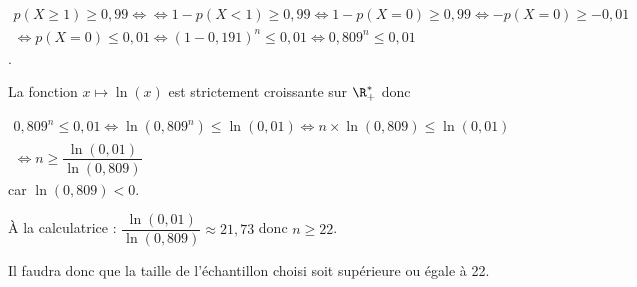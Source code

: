 \begin{enumerate}
	$\begin{gathered}p(X\geqslant 1)\geqslant 0,99 \iff  \iff 1-p(X<1)\geqslant 0,99 \iff 1-p(X=0)\geqslant 0,99 \iff -p(X=0)\geqslant -0,01 \\ \iff  p(X=0)\leqslant 0,01 \iff (1-0,191)^n\leqslant 0,01 \iff 0,809^n\leqslant 0,01\end{gathered}$. 
	
La fonction $x\mapsto\ln(x)$ est strictement croissante sur $\R_+^*$ donc
	
	$\begin{gathered}0,809^n\leqslant 0,01 \iff \ln\left(0,809^n \right) \leqslant \ln(0,01) \iff n \times \ln(0,809) \leqslant \ln(0,01) \\ \iff n\geqslant \dfrac{\ln(0,01)}{\ln(0,809)}\end{gathered}$ car $\ln(0,809)<0$. 

À la calculatrice : $\dfrac{\ln(0,01)}{\ln(0,809)}\approx 21,73$ donc $n\geqslant 22$.

Il faudra donc que la taille de l'échantillon choisi soit supérieure ou égale à 22.
\end{enumerate}

\bigskip
